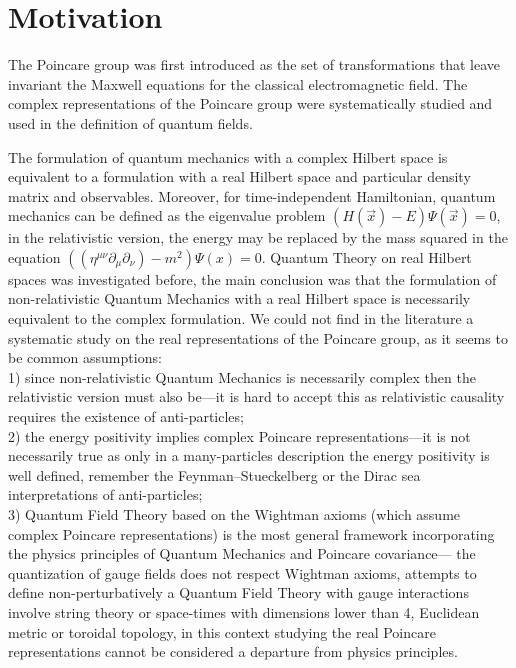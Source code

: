 \documentclass[11pt]{book}
\begin{document}
\hypertarget{motivation}{%
\section{Motivation}\label{motivation}}

The Poincare group was first introduced as the set of transformations
that leave invariant the Maxwell equations for the classical
electromagnetic field. The complex representations of the Poincare group
were systematically studied\cite{Wigner1939On}\cite{Ohnuki1988Unitary}\cite{Straumann2008Unitary}\cite{Knapp2001Representation} and
used in the definition of quantum
fields\cite{Weinberg1964Feynman}\cite{Gross1995Symmetry}.

The formulation of quantum mechanics with a complex Hilbert space is
equivalent to a formulation with a real Hilbert space and particular
density matrix and
observables\cite{Myrheim1999Quantum}.
Moreover, for time-independent Hamiltonian, quantum mechanics can be
defined as the eigenvalue problem
\((H(\vec{x})-E)\Psi(\vec{x})=0\)\cite{Beds2000Time}, in the relativistic version, the energy may be replaced
by the mass squared in the equation
\(((\eta^{\mu\nu}\partial_\mu\partial_\nu)-m^2)\Psi(x)=0\). Quantum
Theory on real Hilbert spaces was investigated
before\cite{Stueckelberg1960Quantum}\cite{Stueckelberg1961Quantum}\cite{Stueckelberg1961Quantum}\cite{Accardi1982On}\cite{Hestenes1967Real}, the
main conclusion was that the formulation of non-relativistic Quantum
Mechanics with a real Hilbert space is necessarily equivalent to the
complex formulation. We could not find in the literature a systematic
study on the real representations of the Poincare group, as it seems to
be common assumptions:\\
1) since non-relativistic Quantum Mechanics is necessarily complex then
the relativistic version must also be---it is hard to accept this as
relativistic causality requires the existence of
anti-particles\cite{Weinberg1995quantum};\\
2) the energy positivity implies complex Poincare representations---it
is not necessarily true as only in a many-particles description the
energy positivity is well defined, remember the Feynman--Stueckelberg or
the Dirac sea interpretations of
anti-particles\cite{Dimock2011Dirac}\cite{Feynman1949theory};\\
3) Quantum Field Theory based on the Wightman axioms (which assume
complex Poincare representations) is the most general framework
incorporating the physics principles of Quantum Mechanics and Poincare
covariance--- the quantization of gauge fields does not respect Wightman
axioms\cite{Strocchi2013introduction}, attempts to define non-perturbatively a Quantum Field Theory
with gauge interactions involve string theory or space-times with
dimensions lower than 4, Euclidean metric or toroidal topology, in this
context studying the real Poincare representations cannot be considered
a departure from physics principles.
\end{document}
